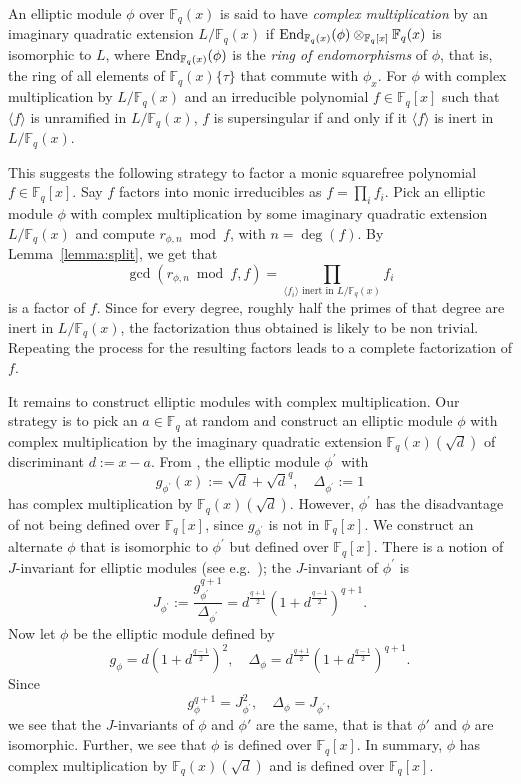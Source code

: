 \documentclass[12pt]{article}
\theoremstyle{plain}
\theoremstyle{definition}
\DeclareMathOperator{\End}{{\rm End}} %
\def\F{\ensuremath{\mathbb{F}}}
\newcommand{\D}{\Delta}
\begin{document}
An elliptic module $\phi$ over $\F_q(x)$ is said to have {\em complex
  multiplication} by an imaginary quadratic extension $L/\F_q(x)$ if
$\End_{\F_q(x)}(\phi)\otimes_{\F_q[x]} \F_q(x)$ is isomorphic to $L$,
where $\End_{\F_q(x)}(\phi)$ is the {\em ring of endomorphisms} of $\phi$,
that is, the ring of all elements of $\F_q(x)\{\tau\}$ that commute
with $\phi_x$. For $\phi$ with complex multiplication by $L/\F_q(x)$
and an irreducible polynomial $f \in \F_q[x]$ such that $\langle f
\rangle$ is unramified in $L/\F_q(x)$, $f$ is supersingular if and
only if it $\langle f \rangle$ is inert in $L/\F_q(x)$.

This suggests the following strategy to factor a monic squarefree
polynomial $f \in \F_q[x]$. Say $f$ factors into monic irreducibles as
$f = \prod_i f_i$. Pick an elliptic module $\phi$ with complex
multiplication by some imaginary quadratic extension
$L/\F_q(x)$ and compute $r_{\phi,n} \bmod f$, with $n=
\deg(f)$. By Lemma~\ref{lemma:split}, we get that 
\begin{equation}
\label{equ:fact-sep}
\gcd(r_{\phi,n}\bmod f, f) =
\prod_{\langle f_i \rangle \text{~inert in~} L/\F_q(x)}f_i
\end{equation}
is a factor of $f$. Since for every degree, roughly half the primes of
that degree are inert in $L/\F_q(x)$, the factorization thus obtained
is likely to be non trivial. Repeating the process for the resulting
factors leads to a complete factorization of $f$.

It remains to construct elliptic modules with complex multiplication.
Our strategy is to pick an $a \in \F_q$ at random and construct an
elliptic module $\phi$ with complex multiplication by the imaginary
quadratic extension $\F_q(x)(\sqrt{d})$ of discriminant $d:=x-a$. From
\cite{dor}, the elliptic module $\phi^\prime$ with
\[ g_{\phi^\prime}(x):=\sqrt{d}+\sqrt{d}^q,\quad \D_{\phi^\prime} := 1 \]
has complex multiplication by $\F_q(x)(\sqrt{d})$. However, $\phi^\prime$ has the disadvantage 
of not being defined over $\F_q[x]$, since $g_{\phi^\prime}$ is not in $\F_q[x]$. We construct an 
alternate $\phi$ that is isomorphic to $\phi^\prime$ but defined over $\F_q[x]$. There
is a notion of $J$-invariant for elliptic modules (see e.g.~\cite{gek});
the  $J$-invariant
 of $\phi^\prime$  is 
\[ J_{\phi^\prime} := \frac{g_{\phi^\prime}^{q+1}}{\D_{\phi^\prime}} = 
d^{\frac{q+1}{2}}\left(1+d^{\frac{q-1}{2}}\right)^{q+1}. \]
Now let $\phi$ be the elliptic module defined by
\[g_\phi = d\left(1 + d^{\frac{q-1}{2}}\right)^2, \quad  \D_\phi = d^{\frac{q + 1}{2}}\left(1 + d^{\frac{q-1}{2}}\right)^{q+1}. \]
Since 
\[ g_\phi^{q+1} = J_{\phi^\prime}^2,\quad \D_{\phi}= J_{\phi^\prime}, \]
we see that the $J$-invariants of $\phi$ and $\phi'$ are the same,
that is that $\phi'$ and $\phi$ are isomorphic.  Further, we see that
$\phi$ is defined over $\F_q[x]$. In summary, $\phi$ has complex
multiplication by $\F_q(x)(\sqrt{d})$ and is defined over
$\F_q[x]$.
\end{document}
